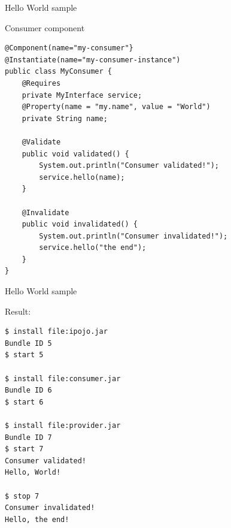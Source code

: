 \begin{frame}[fragile]{Hello World sample}
\begin{block}{Consumer component}
\begin{verbatim}
@Component(name="my-consumer"}
@Instantiate(name="my-consumer-instance")
public class MyConsumer {
	@Requires
	private MyInterface service;
	@Property(name = "my.name", value = "World")
	private String name;
	
	@Validate
	public void validated() {
		System.out.println("Consumer validated!");
		service.hello(name);
	}
	
	@Invalidate
	public void invalidated() {
		System.out.println("Consumer invalidated!");
		service.hello("the end");
	}
}
\end{verbatim}
\end{block}
\end{frame}

\begin{frame}[fragile]{Hello World sample}
\begin{block}{Result:}
\vspace{1em}
\begin{verbatim}
$ install file:ipojo.jar
Bundle ID 5
$ start 5

$ install file:consumer.jar
Bundle ID 6
$ start 6

$ install file:provider.jar
Bundle ID 7
$ start 7
Consumer validated!
Hello, World!

$ stop 7
Consumer invalidated!
Hello, the end!
\end{verbatim}
\end{block}
\end{frame}
